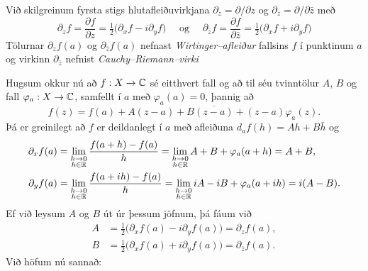 \begin{sk}  Við skilgreinum fyrsta stigs hlutafleiðuvirkjana
${\partial}_z={\partial}/{\partial}z$ og 
${\partial}_{\bar z}={\partial}/{\partial}\bar z$ með
\begin{equation*}
{\partial}_zf=\dfrac{{\partial}f}{{\partial} z}
=\tfrac 12\big({\partial}_xf-i{\partial}_yf\big) \quad \text{ og } \quad
{\partial}_{\bar z}f=\dfrac{{\partial}f}{{\partial}\bar z}
=\tfrac 12\big({\partial}_xf+i{\partial}_yf\big)
\label{4.2.14}
\end{equation*}
Tölurnar ${\partial}_zf(a)$ og ${\partial}_{\bar z}f(a)$ nefnast
{\it Wirtinger--afleiður} fallsins $f$ í punktinum $a$ og virkinn
${\partial}_{\bar z}$ nefnist {\it
Cauchy--Riemann--virki}
\end{sk}





Hugsum okkur nú að $f:X\to {\mathbb C}$ sé eitthvert fall og að til séu
tvinntölur $A$, $B$ og fall $\varphi_a:X\to {\mathbb C}$, samfellt í $a$ með
$\varphi_a(a)=0$, þannig að
\begin{equation}
f(z)=f(a)+A(z-a)+B\overline{(z-a)}+(z-a)\varphi_a(z).
\label{4.2.16}
\end{equation} 
Þá er greinilegt að $f$ er deildanlegt í $a$ með afleiðuna
$d_af(h)=Ah+B\bar h$ og
\begin{align*}
{\partial}_xf(a) &=
\lim_{\substack{ h\to 0\\ h\in {\mathbb R}}} \dfrac{f(a+h)-f(a)}h
=\lim_{\substack{ h\to 0\\ h\in {\mathbb R}}} A+B+\varphi_a(a+h) = A+B,\\
{\partial}_yf(a) &=
\lim_{\substack{ h\to 0\\ h\in {\mathbb R}}} \dfrac{f(a+ih)-f(a)}h
=\lim_{\substack{ h\to 0\\ h\in {\mathbb R}}} iA-iB+\varphi_a(a+ih) = i(A-B).
\end{align*}
Ef við leysum $A$ og $B$ út úr þessum jöfnum, þá fáum við
\begin{align*}
A&= \tfrac 12\big({\partial}_xf(a)-i{\partial}_yf(a)\big)
={\partial}_zf(a),\\
B&= \tfrac 12\big({\partial}_xf(a)+i{\partial}_yf(a)\big)
={\partial}_{\bar z}f(a).
\end{align*}
Við höfum nú sannað:



